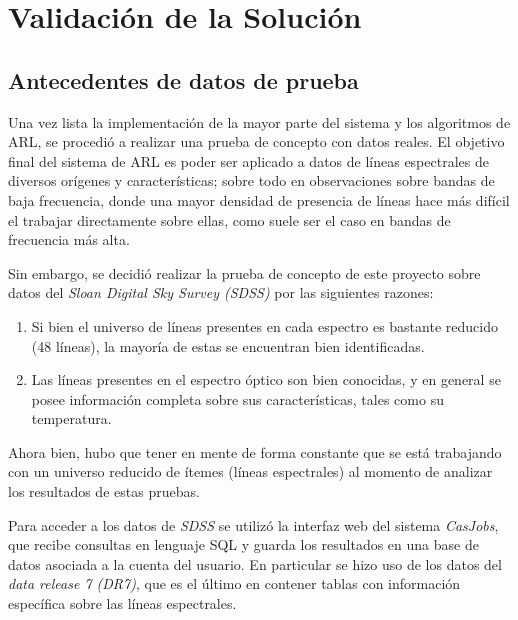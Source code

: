 \chapter{Validación de la Solución}


\section{Antecedentes de datos de prueba}

Una vez lista la implementación de la mayor parte del sistema y los algoritmos de ARL, se procedió a realizar una prueba de concepto con datos reales. El objetivo final del sistema de ARL es poder ser aplicado a datos de líneas espectrales de diversos orígenes y características; sobre todo en observaciones sobre bandas de baja frecuencia, donde una mayor densidad de presencia de líneas hace más difícil el trabajar directamente sobre ellas, como suele ser el caso en bandas de frecuencia más alta.

Sin embargo, se decidió realizar la prueba de concepto de este proyecto sobre datos del \textit{Sloan Digital Sky Survey (SDSS)} por las siguientes razones:

\begin{enumerate}
\item Si bien el universo de líneas presentes en cada espectro es bastante reducido (48 líneas), la mayoría de estas se encuentran bien identificadas.
\item Las líneas presentes en el espectro óptico son bien conocidas, y en general se posee información completa sobre sus características, tales como su temperatura.
\end{enumerate}

Ahora bien, hubo que tener en mente de forma constante que se está trabajando con un universo reducido de ítemes (líneas espectrales) al momento de analizar los resultados de estas pruebas.

Para acceder a los datos de \textit{SDSS} se utilizó la interfaz web del sistema \textit{CasJobs}, que recibe consultas en lenguaje SQL y guarda los resultados en una base de datos asociada a la cuenta del usuario. En particular se hizo uso de los datos del \textit{data release 7 (DR7)}, que es el último en contener tablas con información específica sobre las líneas espectrales.

